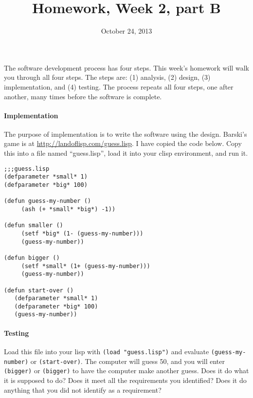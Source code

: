 \documentclass{article}
\title{Homework, Week 2, part B}
\date{October 24, 2013}
\begin{document}
\maketitle{}

\paragraph{}The software development process has four steps. This week's homework will walk you through all four steps. The steps are: (1) analysis, (2) design, (3) implementation, and (4) testing. The process repeats all four steps, one after another, many times before the software is complete.

\paragraph{Implementation}The purpose of implementation is to write the software using the design. Barski's game is at \url{http://landoflisp.com/guess.lisp}. I have copied the code below. Copy this into a file named ``guess.lisp'', load it into your clisp environment, and run it.

\lstset{language=Lisp,numbers=left,keepspaces=true,basicstyle=\small,numberstyle=\tiny}
\begin{lstlisting}
;;;guess.lisp
(defparameter *small* 1)
(defparameter *big* 100)

(defun guess-my-number ()
     (ash (+ *small* *big*) -1))

(defun smaller ()
     (setf *big* (1- (guess-my-number)))
     (guess-my-number))

(defun bigger ()
     (setf *small* (1+ (guess-my-number)))
     (guess-my-number))

(defun start-over ()
   (defparameter *small* 1)
   (defparameter *big* 100)
   (guess-my-number))
\end{lstlisting}

\paragraph{Testing}Load this file into your lisp with \texttt{(load "guess.lisp")} and evaluate \texttt{(guess-my-number)} or \texttt{(start-over)}. The computer will guess 50, and you will enter \texttt{(bigger)} or \texttt{(bigger)} to have the computer make another guess. Does it do what it is supposed to do? Does it meet all the requirements you identified? Does it do anything that you did not identify as a requirement?
\end{document}
